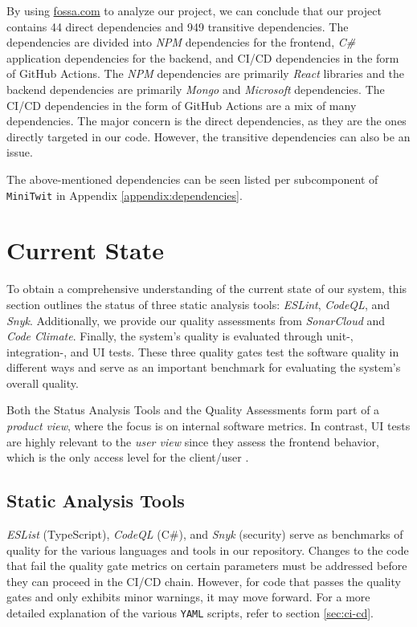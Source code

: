 By using \url{fossa.com} to analyze our project, we can conclude that our project contains 44 direct dependencies and 949 transitive dependencies. The dependencies are divided into \textit{NPM} dependencies for the frontend, \textit{C\#} application dependencies for the backend, and CI/CD dependencies in the form of GitHub Actions.  The \textit{NPM} dependencies are primarily \textit{React} libraries and the backend dependencies are primarily \textit{Mongo} and \textit{Microsoft} dependencies. The CI/CD dependencies in the form of GitHub Actions are a mix of many dependencies. The major concern is the direct dependencies, as they are the ones directly targeted in our code. However, the transitive dependencies can also be an issue. 

The above-mentioned dependencies can be seen listed per subcomponent of \texttt{MiniTwit} in Appendix \ref{appendix:dependencies}.

\section{Current State}

To obtain a comprehensive understanding of the current state of our system, this section outlines the status of three static analysis tools: \textit{ESLint}, \textit{CodeQL}, and \textit{Snyk}. Additionally, we provide our quality assessments from \textit{SonarCloud} and \textit{Code Climate}. Finally, the system's quality is evaluated through unit-, integration-, and UI tests. These three quality gates test the software quality in different ways and serve as an important benchmark for evaluating the system's overall quality.

Both the Status Analysis Tools and the Quality Assessments form part of a \textit{product view}, where the focus is on internal software metrics. In contrast, UI tests are highly relevant to the \textit{user view} since they assess the frontend behavior, which is the only access level for the client/user \cite[pp. 13-15]{kitchenham1996software}.

\subsection{Static Analysis Tools}

\textit{ESList} (TypeScript), \textit{CodeQL} (C\#), and \textit{Snyk} (security) serve as benchmarks of quality for the various languages and tools in our repository. Changes to the code that fail the quality gate metrics on certain parameters must be addressed before they can proceed in the CI/CD chain. However, for code that passes the quality gates and only exhibits minor warnings, it may move forward. For a more detailed explanation of the various \texttt{YAML} scripts, refer to section \ref{sec:ci-cd}.

